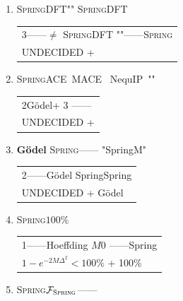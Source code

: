 \documentclass[12pt,a4paper]{article}
\theoremstyle{remark}
\newcommand{\Fset}{\mathcal{F}}
\newcommand{\Spring}{\textsc{Spring}}
\begin{document}
\begin{enumerate}[label=\textbf{ \arabic*}, leftmargin=*, itemsep=10pt]

    \item \textbf{}
    \Spring{}DFT""
    \Spring{}DFT
    
    \begin{center}
    \footnotesize
    \begin{tabular}{p{13cm}}
    \textbf{} 3——$\neq$
    \Spring{}DFT
    ""——\Spring{} \\
    \textbf{} \textsc{UNDECIDED} + 
    \end{tabular}
    \end{center}

    \item \textbf{}
    \Spring{}ACE~\cite{drautz2019}MACE~\cite{batatia2022}
    NequIP~\cite{batzner2022}""
    
    \begin{center}
    \footnotesize
    \begin{tabular}{p{13cm}}
    \textbf{} 2G\"odel+ 3
    \textbf{}——
     \\
    \textbf{} \textsc{UNDECIDED} + 
    \end{tabular}
    \end{center}

    \item \textbf{G\"odel}
    \Spring{}——
    "SpringM"
    
    \begin{center}
    \footnotesize
    \begin{tabular}{p{13cm}}
    \textbf{} 2——G\"odel
    SpringSpring \\
    \textbf{} \textsc{UNDECIDED} + G\"odel
    \end{tabular}
    \end{center}

    \item \textbf{}
    \Spring{}$100\%$
    
    \begin{center}
    \footnotesize
    \begin{tabular}{p{13cm}}
    \textbf{} 1——Hoeffding
    $M$0
    ——Spring \\
    \textbf{} $1-e^{-2M\Delta^2} < 100\%$ + 100\%
    \end{tabular}
    \end{center}

    \item \textbf{}
    \Spring{}$\Fset_{\Spring}$——
    

\end{enumerate}
\end{document}

